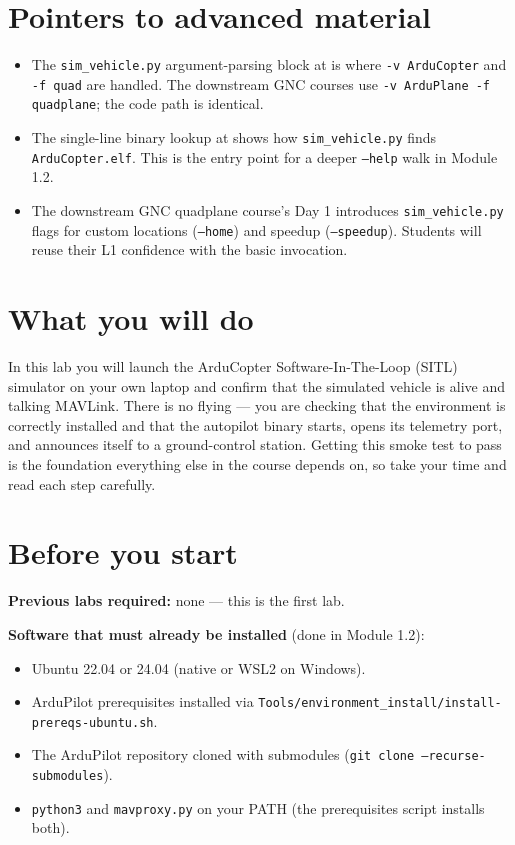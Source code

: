 \documentclass[a4paper,11pt,twoside]{article}
\begin{document}
\section*{Pointers to advanced material}

\begin{itemize}
  \item The \texttt{sim\_vehicle.py} argument-parsing block at  is where \texttt{-v ArduCopter} and \texttt{-f quad} are handled. The downstream GNC courses use \texttt{-v ArduPlane -f quadplane}; the code path is identical.
  \item The single-line binary lookup at  shows how \texttt{sim\_vehicle.py} finds \texttt{ArduCopter.elf}. This is the entry point for a deeper \texttt{--help} walk in Module 1.2.
  \item The downstream GNC quadplane course's Day 1 introduces \texttt{sim\_vehicle.py} flags for custom locations (\texttt{--home}) and speedup (\texttt{--speedup}). Students will reuse their L1 confidence with the basic invocation.
\end{itemize}

\else

\section*{What you will do}

In this lab you will launch the ArduCopter Software-In-The-Loop (SITL) simulator on your own laptop and confirm that the simulated vehicle is alive and talking MAVLink. There is no flying --- you are checking that the environment is correctly installed and that the autopilot binary starts, opens its telemetry port, and announces itself to a ground-control station. Getting this smoke test to pass is the foundation everything else in the course depends on, so take your time and read each step carefully.

\section*{Before you start}

\textbf{Previous labs required:} none --- this is the first lab.

\textbf{Software that must already be installed} (done in Module 1.2):
\begin{itemize}
  \item Ubuntu 22.04 or 24.04 (native or WSL2 on Windows).
  \item ArduPilot prerequisites installed via \texttt{Tools/environment\_install/install-prereqs-ubuntu.sh}.
  \item The ArduPilot repository cloned with submodules (\texttt{git clone --recurse-submodules}).
  \item \texttt{python3} and \texttt{mavproxy.py} on your PATH (the prerequisites script installs both).
\end{itemize}
\end{document}
